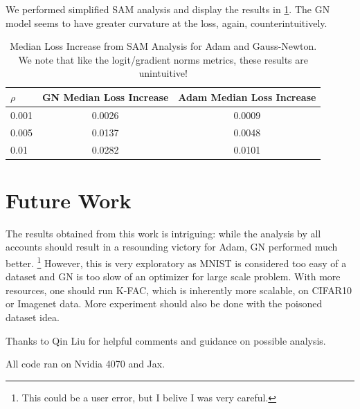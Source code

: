 \documentclass{article}
\begin{document}
    We performed simplified SAM analysis and display the results in \cref{tab:sam_results}.
    The GN model seems to have greater curvature at the loss, again, counterintuitively.


    \begin{table}[ht!]
        \centering
        \caption{Median Loss Increase from SAM Analysis for Adam and Gauss-Newton.
        We note that like the logit/gradient norms metrics, these results are unintuitive!}
        \label{tab:sam_results}
        \begin{tabular}{|l|c|c|}
            \hline
            \textbf{$\rho$} & \textbf{GN Median Loss Increase} & \textbf{Adam Median Loss Increase} \\
            \hline
            0.001 & 0.0026 & 0.0009\\
            \hline
            0.005 & 0.0137 & 0.0048 \\
            \hline
            0.01 & 0.0282 & 0.0101  \\
            \hline
        \end{tabular}
    \end{table}

    \section{Future Work}
    The results obtained from this work is intriguing: while the analysis by all accounts should result in a resounding victory for Adam, GN performed much better. \footnote{This could be a user error, but I belive I was very careful.}
    However, this is very exploratory as MNIST is considered too easy of a dataset and GN is too slow of an optimizer for large scale problem.
    With more resources, one should run K-FAC, which is inherently more scalable, on CIFAR10 or Imagenet data.
    More experiment should also be done with the poisoned dataset idea.

    \begin{ack}
        Thanks to Qin Liu for helpful comments and guidance on possible analysis.

        All code ran on Nvidia 4070 and Jax.
    \end{ack}
    
    
\end{document}
